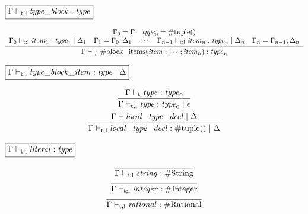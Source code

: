 $\fbox{$\Gamma \vdash_{\mathrm{t}; \mathrm{l}} \mathit{type\_block}: \mathit{type}$}$

\begin{gather*}
    \infer{\Gamma \vdash_{\mathrm{t}; \mathrm{l}} \mathrm{\#block\_items}(\mathit{item}_1; \cdots; \mathit{item}_n): \mathit{type}_n}{
        \begin{array}{c}
            \Gamma_0 = \Gamma
            \hspace{1em}
            \mathit{type}_0 = \mathrm{\#tuple}()
            \\
            \Gamma_0 \vdash_{\mathrm{t}; \mathrm{l}} \mathit{item}_1: \mathit{type}_1 \mid \Delta_1
            \hspace{1em}
            \Gamma_1 = \Gamma_0; \Delta_1
            \hspace{1em}
            \cdots
            \hspace{1em}
            \Gamma_{n - 1} \vdash_{\mathrm{t}; \mathrm{l}} \mathit{item}_n: \mathit{type}_n \mid \Delta_n
            \hspace{1em}
            \Gamma_n = \Gamma_{n - 1}; \Delta_n
        \end{array}
    }
\end{gather*}

$\fbox{$\Gamma \vdash_{\mathrm{t}; \mathrm{l}} \mathit{type\_block\_item}: \mathit{type} \mid \Delta$}$

\begin{gather*}
    \infer{\Gamma \vdash_{\mathrm{t}; \mathrm{l}} \mathit{type}: \mathit{type}_0 \mid \epsilon}{
        \Gamma \vdash_\mathrm{t} \mathit{type}: \mathit{type}_0
    }
    \\
    \infer{\Gamma \vdash_{\mathrm{t}; \mathrm{l}} \mathit{local\_type\_decl}: \mathrm{\#tuple}() \mid \Delta}{
        \Gamma \vdash \mathit{local\_type\_decl} \mid \Delta
    }
\end{gather*}

$\fbox{$\Gamma \vdash_{\mathrm{t}; \mathrm{l}} \mathit{literal}: \mathit{type}$}$

\begin{gather*}
    \infer{\Gamma \vdash_{\mathrm{t}; \mathrm{l}} \mathit{string}: \mathrm{\#String}}{}
    \\
    \infer{\Gamma \vdash_{\mathrm{t}; \mathrm{l}} \mathit{integer}: \mathrm{\#Integer}}{}
    \\
    \infer{\Gamma \vdash_{\mathrm{t}; \mathrm{l}} \mathit{rational}: \mathrm{\#Rational}}{}
\end{gather*}


